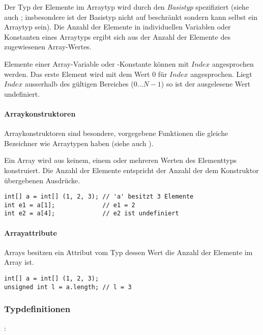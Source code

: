Der Typ der Elemente im Arraytyp wird durch den \emph{Basistyp} spezifiziert (siehe auch ;
insbesondere ist der Basistyp nicht auf  beschränkt sondern kann selbst ein Arraytyp sein).
Die Anzahl der Elemente in individuellen Variablen oder Konstanten eines Arraytyps
ergibt sich aus der Anzahl der Elemente des zugewiesenen Array-Wertes.

Elemente einer Array-Variable oder -Konstante können mit \ident{Bezeichner[}$\mathit{Index}$\ident{]} angesprochen
werden. Das erste Element wird mit dem Wert $0$ für $\mathit{Index}$ angesprochen.
Liegt $\mathit{Index}$ ausserhalb des gültigen Bereiches ($0\dots{}N-1$) so ist der ausgelesene Wert
undefiniert.



\paragraph{Arraykonstruktoren}\label{Arraykonstruktoren}


Arraykonstruktoren sind besondere, vorgegebene Funktionen die gleiche Bezeichner wie Arraytypen haben
(siehe auch ).

Ein Array wird aus keinem, einem oder mehreren Werten des Elementtyps konstruiert.
Die Anzahl der Elemente entspricht der Anzahl der dem Konstruktor übergebenen Ausdrücke.

\begin{lstlisting}
int[] a = int[] (1, 2, 3); // 'a' besitzt 3 Elemente
int e1 = a[1];             // e1 = 2
int e2 = a[4];             // e2 ist undefiniert
\end{lstlisting}

\paragraph{Arrayattribute}\label{Arrayattribute}

Arrays besitzen ein Attribut  vom Typ  dessen Wert
die Anzahl der Elemente im Array ist.

\begin{lstlisting}
int[] a = int[] (1, 2, 3);
unsigned int l = a.length; // l = 3
\end{lstlisting}

\subsubsection{Typdefinitionen}\label{Typdefinitionen}
:\label{typ_definition}\\
\hspace*{1cm}\Gspace{} \Gspace{}\\

